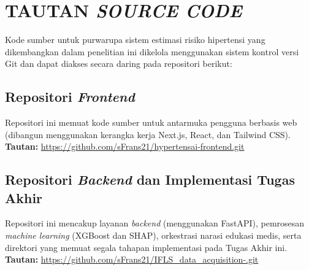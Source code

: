 \cleardoublepage
\chapter{TAUTAN \textit{SOURCE CODE}}

Kode sumber untuk purwarupa sistem estimasi risiko hipertensi yang dikembangkan dalam penelitian ini dikelola menggunakan sistem kontrol versi Git dan dapat diakses secara daring pada repositori berikut:

\section{Repositori \textit{Frontend}}
Repositori ini memuat kode sumber untuk antarmuka pengguna berbasis web (dibangun menggunakan kerangka kerja Next.js, React, dan Tailwind CSS).
\newline
\textbf{Tautan:} \url{https://github.com/sFrans21/hypertensai-frontend.git}

\section{Repositori \textit{Backend} dan Implementasi Tugas Akhir}
Repositori ini mencakup layanan \textit{backend} (menggunakan FastAPI), pemrosesan \textit{machine learning} (XGBoost dan SHAP), orkestrasi narasi edukasi medis, serta direktori yang memuat segala tahapan implementasi pada Tugas Akhir ini.
\newline
\textbf{Tautan:} \url{https://github.com/sFrans21/IFLS_data_acquisition-.git}
